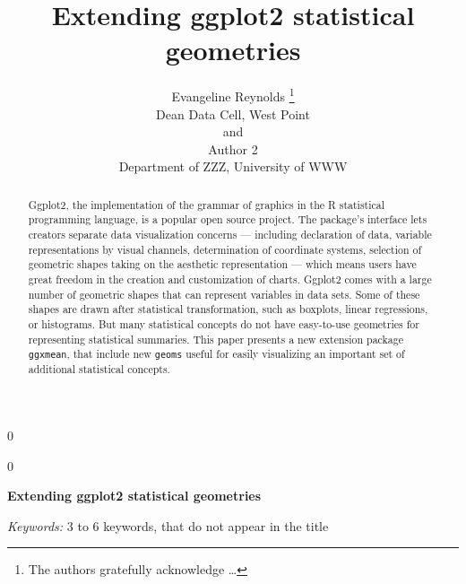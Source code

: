 \documentclass[12pt]{article}
\newcommand{\blind}{0}
\begin{document}
\def\spacingset#1{\renewcommand{\baselinestretch}%
{#1}\small\normalsize} \spacingset{1}



\blind
{
  \title{\bf Extending ggplot2 statistical geometries}

  \author{
        Evangeline Reynolds \thanks{The authors gratefully acknowledge \ldots{}} \\
    Dean Data Cell, West Point\\
     and \\     Author 2 \\
    Department of ZZZ, University of WWW\\
      }
  \maketitle
} \fi

\blind
{
  \bigskip
  \bigskip
  \bigskip
  \begin{center}
    {\LARGE\bf Extending ggplot2 statistical geometries}
  \end{center}
  \medskip
} \fi

\bigskip
\begin{abstract}
Ggplot2, the implementation of the grammar of graphics in the R
statistical programming language, is a popular open source project. The
package's interface lets creators separate data visualization concerns
--- including declaration of data, variable representations by visual
channels, determination of coordinate systems, selection of geometric
shapes taking on the aesthetic representation --- which means users have
great freedom in the creation and customization of charts. Ggplot2 comes
with a large number of geometric shapes that can represent variables in
data sets. Some of these shapes are drawn after statistical
transformation, such as boxplots, linear regressions, or histograms. But
many statistical concepts do not have easy-to-use geometries for
representing statistical summaries. This paper presents a new extension
package \texttt{ggxmean}, that include new \texttt{geoms} useful for
easily visualizing an important set of additional statistical concepts.
\end{abstract}

\noindent%
{\it Keywords:} 3 to 6 keywords, that do not appear in the title
\vfill

\newpage
\spacingset{1.45} %
\end{document}
